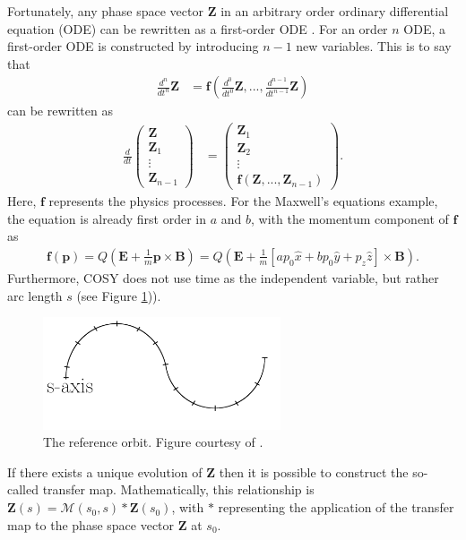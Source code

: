 Fortunately, any phase space vector $\mathbf{Z}$ in an arbitrary order ordinary differential equation (ODE) can be rewritten as a first-order ODE \cite{modernMapMethods}. For an order $n$ ODE, a first-order ODE is constructed by introducing $n-1$ new variables. This is to say that
\begin{align} \nonumber
\frac{d^n}{dt^n}\mathbf{Z}&=\mathbf{f}(\frac{d^0}{dt^0}\mathbf{Z},...,\frac{d^{n-1}}{dt^{n-1}}\mathbf{Z})
\end{align}
can be rewritten as
\begin{align} \nonumber
\frac{d}{dt} \begin{pmatrix}
		\mathbf{Z} \\ \mathbf{Z}_1 \\ \vdots \\ \mathbf{Z}_{n-1}
		\end{pmatrix}
&= 		\begin{pmatrix}
		\mathbf{Z}_1 \\ \mathbf{Z}_2 \\ \vdots \\ \mathbf{f}(\mathbf{Z},...,\mathbf{Z}_{n-1})
		\end{pmatrix}.
\end{align}
Here, $\mathbf{f}$ represents the physics processes. For the Maxwell's equations example, the equation is already first order in $a$ and $b$, with the momentum component of $\mathbf{f}$ as
\begin{align}\nonumber
\mathbf{f}(\mathbf{p})=Q(\mathbf{E}+\frac{1}{m}\mathbf{p}\times\mathbf{B})=Q(\mathbf{E}+\frac{1}{m}\left[ap_0 \hat{x} + bp_0\hat{y} + p_z \hat{z}\right]\times\mathbf{B}).
\end{align}
 Furthermore, COSY does not use time as the independent variable, but rather arc length $s$ (see Figure \ref{fig:saxis})).

\begin{figure}[h!]
\centering
\includegraphics*[width=70mm]{./Figures/saxis}
\caption{The reference orbit. Figure courtesy of \cite{berzFullnotes}.}
\label{fig:saxis}
\end{figure}

If there exists a unique evolution of $\mathbf{Z}$ then it is possible to construct the so-called transfer map. Mathematically, this relationship is $\mathbf{Z}(s)=\mathcal{M}(s_0 , s)*\mathbf{Z}(s_0)$, with $*$ representing the application of the transfer map to the phase space vector $\mathbf{Z}$ at $s_0$. 

